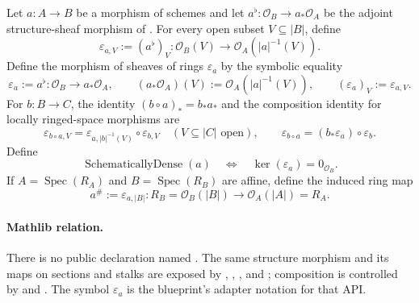 \begin{definition}
  \label{def:nagata-direct-image-structure-map}
  \lean{}

  Let $a\colon A\to B$ be a morphism of schemes and let
  \(a^\flat\colon\mathcal O_B\to a_*\mathcal O_A\) be the adjoint
  structure-sheaf morphism of
  .  For every open subset
  $V\subseteq|B|$, define
  \[
    \varepsilon_{a,V}:=(a^\flat)_V\colon
      \mathcal O_B(V)\longrightarrow
      \mathcal O_A(|a|^{-1}(V)).
  \]
  Define the morphism of sheaves of rings $\varepsilon_a$ by the symbolic
  equality
  \[
    \varepsilon_a:=a^\flat\colon
      \mathcal O_B\longrightarrow a_*\mathcal O_A,
    \qquad
    (a_*\mathcal O_A)(V):=\mathcal O_A(|a|^{-1}(V)),
    \qquad
    (\varepsilon_a)_V:=\varepsilon_{a,V}.
  \]
  For $b\colon B\to C$, the identity $(b\circ a)_*=b_*a_*$ and the
  composition identity for locally ringed-space morphisms are
  \[
    \varepsilon_{b\circ a,V}
      =\varepsilon_{a,|b|^{-1}(V)}\circ\varepsilon_{b,V}
      \quad(V\subseteq|C|\text{ open}),
    \qquad
    \varepsilon_{b\circ a}
      =(b_*\varepsilon_a)\circ\varepsilon_b.
  \]
  Define
  \[
    \operatorname{SchematicallyDense}(a)
      \quad\Longleftrightarrow\quad
    \ker(\varepsilon_a)=0_{\mathcal O_B}.
  \]
  If \(A=\operatorname{Spec}(R_A)\) and
  \(B=\operatorname{Spec}(R_B)\) are affine, define the induced ring map
  \[
    a^\#:=\varepsilon_{a,|B|}\colon
      R_B=\mathcal O_B(|B|)
      \longrightarrow
      \mathcal O_A(|A|)=R_A.                                      \tag{DIM0}
  \]

  \paragraph{Mathlib relation.}
  There is no public declaration named
  \texttt{}.  The same
  structure morphism and its maps on sections and stalks are exposed by
  \texttt{},
  \texttt{},
  \texttt{}, and
  \texttt{}; composition is controlled by
  \texttt{} and
  \texttt{}.  The symbol
  $\varepsilon_a$ is the blueprint's adapter notation for that API.
\end{definition}

